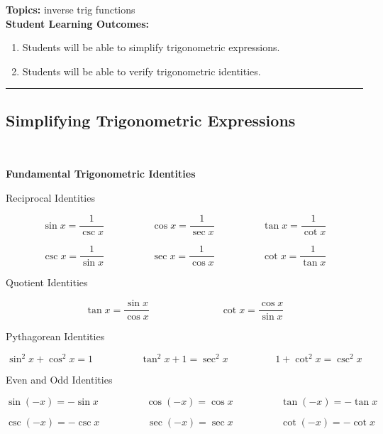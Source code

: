 
\noindent \textbf{Topics:}  inverse trig functions\\

\noindent \textbf{Student Learning Outcomes:}
\begin{enumerate}
\item Students will be able to simplify trigonometric expressions.
\item Students will be able to verify trigonometric identities.

\end{enumerate}

\hrule 

\bigskip

\subsection{Simplifying Trigonometric Expressions} ~

\begin{boxthm}
{\bf Fundamental Trigonometric Identities}

Reciprocal Identities

$$\sin x =\frac{1}{\csc x} \hspace{2cm}\cos x = \frac{1}{\sec x}\hspace{2cm}\tan x = \frac{1}{\cot x}$$

$$\csc x =\frac{1}{\sin x} \hspace{2cm}\sec x = \frac{1}{\cos x}\hspace{2cm}\cot x = \frac{1}{\tan x}$$

Quotient Identities

$$\tan x = \frac{\sin x}{\cos x} \hspace{3cm} \cot x = \frac{\cos x}{\sin x}$$

Pythagorean Identities

$$\sin^2 x + \cos^2 x=1 \hspace{2cm}\tan^2 x +1 = \sec^2 x \hspace{2cm}1+\cot^2 x = \csc^2 x$$

Even and Odd Identities

$$\sin( -x) =-\sin x\hspace{2cm}\cos( -x) = \cos x\hspace{2cm}\tan(- x) = -\tan x$$

$$\csc( -x) =-\csc x\hspace{2cm}\sec( -x) = \sec x\hspace{2cm}\cot(- x) = -\cot x$$

\end{boxthm}

